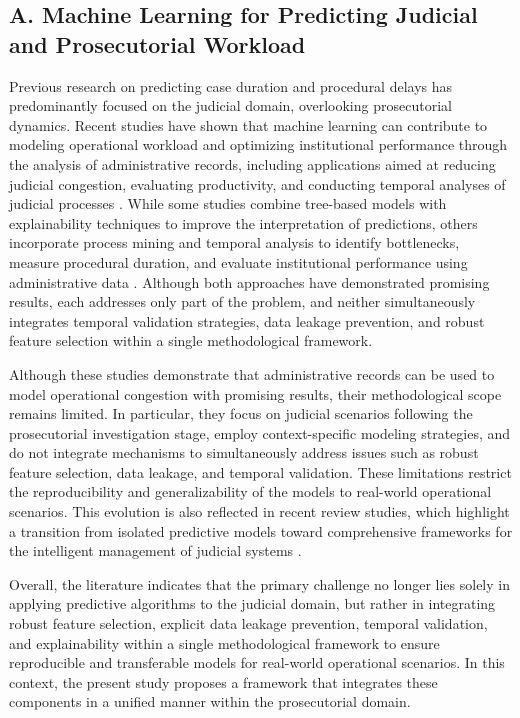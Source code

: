 \documentclass[
  number]{elsarticle}
\begin{document}
\subsection{A. Machine Learning for Predicting Judicial and
Prosecutorial
Workload}\label{a.-machine-learning-for-predicting-judicial-and-prosecutorial-workload}

Previous research on predicting case duration and procedural delays has
predominantly focused on the judicial domain, overlooking prosecutorial
dynamics. Recent studies have shown that machine learning can contribute
to modeling operational workload and optimizing institutional
performance through the analysis of administrative records, including
applications aimed at reducing judicial congestion, evaluating
productivity, and conducting temporal analyses of judicial processes
\citep{azaria_alleviating_2024, vasconcelos_analysis_2023, pernici_improving_2024}.
While some studies combine tree-based models with explainability
techniques to improve the interpretation of predictions, others
incorporate process mining and temporal analysis to identify
bottlenecks, measure procedural duration, and evaluate institutional
performance using administrative data
\citep{azaria_alleviating_2024, pernici_improving_2024}. Although both
approaches have demonstrated promising results, each addresses only part
of the problem, and neither simultaneously integrates temporal
validation strategies, data leakage prevention, and robust feature
selection within a single methodological framework.

Although these studies demonstrate that administrative records can be
used to model operational congestion with promising results, their
methodological scope remains limited. In particular, they focus on
judicial scenarios following the prosecutorial investigation stage,
employ context-specific modeling strategies, and do not integrate
mechanisms to simultaneously address issues such as robust feature
selection, data leakage, and temporal validation. These limitations
restrict the reproducibility and generalizability of the models to
real-world operational scenarios. This evolution is also reflected in
recent review studies, which highlight a transition from isolated
predictive models toward comprehensive frameworks for the intelligent
management of judicial systems \citep{hannoon_artificial_2025}.

Overall, the literature indicates that the primary challenge no longer
lies solely in applying predictive algorithms to the judicial domain,
but rather in integrating robust feature selection, explicit data
leakage prevention, temporal validation, and explainability within a
single methodological framework to ensure reproducible and transferable
models for real-world operational scenarios. In this context, the
present study proposes a framework that integrates these components in a
unified manner within the prosecutorial domain.
\end{document}
